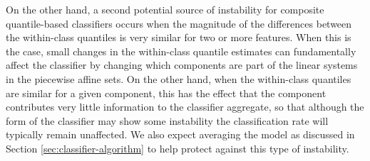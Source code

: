 On the other hand, a second potential source of instability for composite
quantile-based classifiers occurs when the magnitude of the differences between
the within-class quantiles is very similar for two or more features.  When this
is the case, small changes in the within-class quantile estimates can
fundamentally affect the classifier by changing which components are part of the
linear systems in the piecewise affine sets.  On the other hand, when the
within-class quantiles are similar for a given component, this has the effect
that the component contributes very little information to the classifier
aggregate, so that although the form of the classifier may show some instability
the classification rate will typically remain unaffected.  We also expect
averaging the model as discussed in Section \ref{sec:classifier-algorithm} to
help protect against this type of instability.




